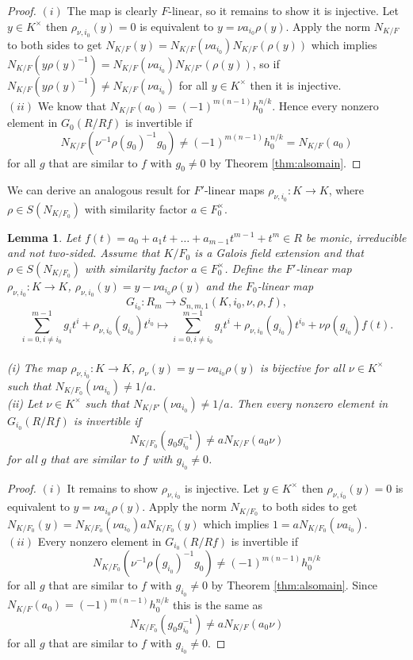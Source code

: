\documentclass[12pt]{amsart}
\theoremstyle{plain}
\newtheorem{lemma}[theorem]{Lemma}
\theoremstyle{definition}
\numberwithin{equation}{section}
\numberwithin{figure}{section}
\begin{document}
\begin{proof}
$(i)$ The map is clearly $F$-linear, so it remains to show it is injective. Let $y\in K^\times$ then $\rho_{\nu,i_0}(y)=0$ is equivalent to $y=\nu a_{i_0}\rho(y)$. Apply the norm $N_{K/F}$ to both sides to get  $N_{K/F}(y)=N_{K/F}(\nu a_{i_0}) N_{K/F}(\rho(y))$ which implies
$N_{K/F}(y \rho(y)^{-1})=N_{K/F}(\nu a_{i_0}) N_{K/F'}(\rho(y))$, so if
$N_{K/F}(y \rho(y)^{-1})\not =N_{K/F}(\nu a_{i_0}) $ for all $y\in K^\times$ then it is injective.
\\ $(ii)$ We know that
$N_{K/F}(a_0)=(-1)^{m(n-1)}h_0^{n/k}$. Hence every nonzero element in $G_{0}(R/Rf)$ is invertible if
 $$N_{K/F}( \nu^{-1}\rho(g_{0})^{-1}  g_0 )\not=(-1)^{m(n-1)}h_0^{n/k}= N_{K/F}(a_0 )$$
for all $g$ that are similar to $f$ with $g_{0}\not=0$ by Theorem \ref{thm:alsomain}.

\end{proof}

We can derive an analogous result for $F'$-linear maps $\rho_{\nu,i_0}: K\to K$, where $\rho\in S(N_{K/F_0})$ with similarity factor $a\in F_0^\times$.

\begin{lemma} \label{le:important2}
Let $f(t)=a_0+a_1t+\dots+ a_{m-1} t^{m-1}+t^m \in R$ be monic, irreducible and not two-sided.
Assume that $K/F_0$ is a Galois field extension and that $\rho\in S(N_{K/F_0})$ with similarity factor $a\in F_0^\times$.
 Define the $F'$-linear map $\rho_{\nu,i_0}: K\to K$, $\rho_{\nu,i_0}(y)=y-\nu a_{i_0}\rho(y)$ and the $F_0$-linear map
$$G_{i_0}:R_m\to S_{n,m,1}(K,i_0,\nu,\rho, f),$$
$$\sum_{i=0,i\not=i_0}^{m-1} g_it^i +\rho_{\nu,i_0}(g_{i_0})t^{i_0}\mapsto
\sum_{i=0,i\not=i_0}^{m-1} g_it^i +\rho_{\nu,i_0}(g_{i_0})t^{i_0}+\nu\rho(g_{i_0})f(t).$$
\\ (i) The map $\rho_{\nu,i_0}: K\to K$, $\rho_\nu(y)=y-\nu a_{i_0}\rho(y)$ is  bijective for all $\nu\in K^\times$ such that $ N_{K/F_0}(\nu a_{i_0}) \not=1/a$.
\\ (ii)
 Let $\nu\in K^\times$ such that $ N_{K/F'}(\nu a_{i_0}) \not=1/a$.  Then every nonzero element in $G_{i_0}(R/Rf)$ is invertible if
 $$ N_{K/F_0}( g_0 g_{i_0}^{-1} )\not= a N_{K/F}(a_0 \nu)$$
for all $g$ that are similar to $f$ with $g_{i_0}\not=0$.
\end{lemma}


\begin{proof}
$(i)$ It remains to show $\rho_{\nu,i_0}$ is injective. Let $y\in K^\times$ then $\rho_{\nu,i_0}(y)=0$ is equivalent to $y=\nu a_{i_0}\rho(y)$. Apply the norm $N_{K/F_0}$ to both sides to get $N_{K/F_0}(y)=N_{K/F_0}(\nu a_{i_0}) aN_{K/F_0}(y)$ which implies
$1= a N_{K/F_0}(\nu a_{i_0}) $.
\\ $(ii)$
Every nonzero element in $G_{i_0}(R/Rf)$ is invertible if
$$N_{K/F_0}(\nu^{-1} \rho(g_{i_0})^{-1}  g_0 )\not=(-1)^{m(n-1)}h_0^{n/k}$$
for all $g$ that are similar to $f$ with $g_{i_0}\not=0$ by Theorem \ref{thm:alsomain}. Since
$N_{K/F}(a_0)=(-1)^{m(n-1)}h_0^{n/k}$ this is the same as
$$ N_{K/F_0}( g_0 g_{i_0}^{-1} )\not=  aN_{K/F}(a_0 \nu)$$
for all $g$ that are similar to $f$ with $g_{i_0}\not=0$.
\end{proof}
\end{document}
